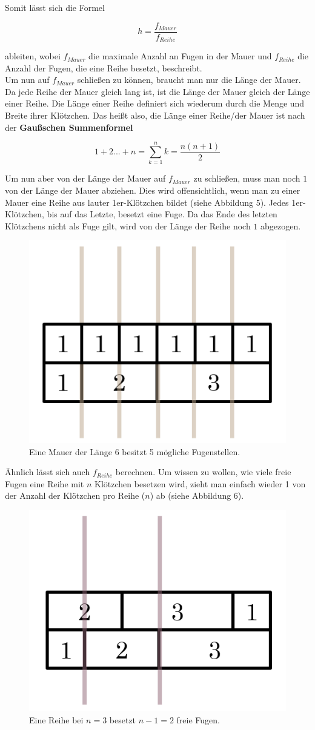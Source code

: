 \documentclass[a4paper,12pt]{article}
\begin{document}
Somit lässt sich die Formel
\begin{center}
\begin{Large}
\[h = \frac{f_{Mauer}}{f_{Reihe}}\]
\end{Large}
\end{center}
ableiten, wobei $f_{Mauer}$ die maximale Anzahl an Fugen in der Mauer und $f_{Reihe}$ die Anzahl der Fugen, die eine Reihe besetzt, beschreibt.
\\[0.4cm]
Um nun auf $f_{Mauer}$ schließen zu können, braucht man nur die Länge der Mauer. Da jede Reihe der Mauer gleich lang ist, ist die Länge der Mauer gleich der Länge einer Reihe. Die Länge einer Reihe definiert sich wiederum durch die Menge und Breite ihrer Klötzchen. Das heißt also, die Länge einer Reihe/der Mauer ist nach der \textbf{Gaußschen Summenformel}
\begin{center}
\begin{Large}
\[1+2...+n = \sum_{k=1}^n k = \frac{n(n+1)}{2}\]
\end{Large}
\end{center}
Um nun aber von der Länge der Mauer auf $f_{Mauer}$ zu schließen, muss man noch $1$ von der Länge der Mauer abziehen. Dies wird offensichtlich, wenn man zu einer Mauer eine Reihe aus lauter 1er-Klötzchen bildet (siehe Abbildung 5). Jedes 1er-Klötzchen, bis auf das Letzte, besetzt eine Fuge. Da das Ende des letzten Klötzchens nicht als Fuge gilt, wird von der Länge der Reihe noch $1$ abgezogen.
\begin{figure}[H]
    \centering
    \includegraphics[width=0.4\linewidth]{Bilder/Aufgabe1/Definition_Fugenstellen_Mauer.png}
    \caption{Eine Mauer der Länge 6 besitzt 5 mögliche Fugenstellen.}
\end{figure}

Ähnlich lässt sich auch $f_{Reihe}$ berechnen. Um wissen zu wollen, wie viele freie Fugen eine Reihe mit $n$ Klötzchen besetzen wird, zieht man einfach wieder 1 von der Anzahl der Klötzchen pro Reihe ($n$) ab (siehe Abbildung 6).
\begin{figure}[H]
    \centering
    \includegraphics[width=0.4\linewidth]{Bilder/Aufgabe1/Definition_Fugenstellen_Reihe.png}
    \caption{Eine Reihe bei $n = 3$ besetzt $n-1 = 2$ freie Fugen.}
\end{figure}
\end{document}
